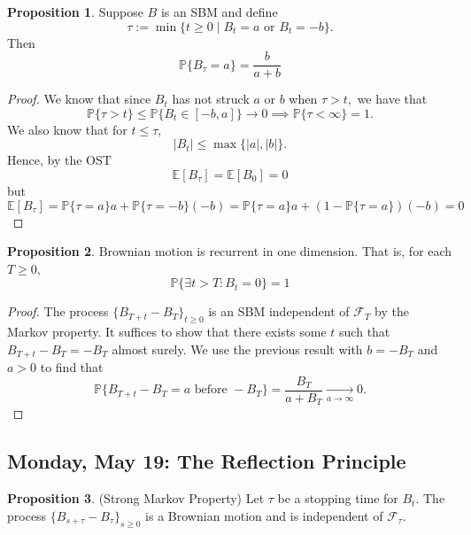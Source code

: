 \documentclass[10pt, oneside]{article}
\newcommand{\bbP}{\mathbb{P}}
\newcommand{\bbE}{\mathbb{E}}
\theoremstyle{definition}
\newtheorem{prop}{Proposition}
\begin{document}
\begin{prop}
    Suppose $B$ is an SBM and define 
    \[\tau:= \min\{t \geq 0 \mid B_t =a \text{ or } B_t = -b\}.\] Then 
    \[\bbP\{B_\tau = a\} = \frac{b}{a + b}\]
\end{prop}
\begin{proof}
    We know that since $B_t$ has not struck $a$ or $b$ when $\tau >t,$ we have that 
    \[\bbP\{\tau >t \}\leq \bbP\{B_t \in [-b, a]\} \to 0\implies \bbP\{\tau < \infty\} = 1.\]
    We also know that for $t\leq \tau,$
    \[|B_t| \leq \max\{|a|, |b|\}.\] Hence, by the OST
    \[\bbE[B_\tau]=\bbE[B_0] = 0\] but 
    \[\bbE[B_\tau]= \bbP\{\tau = a\}a + \bbP\{\tau = -b\}(-b)= \bbP\{\tau = a\}a + (1-\bbP\{\tau = a\})(-b) = 0\]
\end{proof}

\begin{prop}
    Brownian motion is recurrent in one dimension. That is, for each $T\geq 0 ,$ 
    \[\bbP\{\exists t>T: B_t = 0\} = 1\]
\end{prop}
\begin{proof}
    The process 
    $\{B_{T + t} - B_T\}_{t\geq 0}$ is an SBM independent of $\mathcal{F}_T$ by the Markov property. It suffices to show that there exists some $t$ such that $B_{T + t} - B_T = -B_T$ almost surely. We use the previous result with $b = -B_T$ and $a>0$ to find that 
    \[\bbP\{B_{T + t} - B_T = a \text{ before } -B_T\}  =\frac{B_T}{a + B_T} \xrightarrow[a\to \infty]{} 0 .\] 
\end{proof}


\newpage
\subsection{Monday, May 19: The Reflection Principle}

\begin{prop}
    (Strong Markov Property) Let $\tau$ be a stopping time for $B_t.$ The process $\{B_{ s + \tau} - B_\tau\}_{s\geq 0}$ is a Brownian motion and is independent of $\mathcal{F}_\tau.$
\end{prop}
\end{document}
